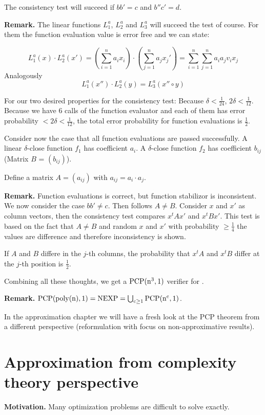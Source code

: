 \documentclass[a4paper]{article}
\newcommand{\cls}[1]{\rm{#1}}
\newcommand{\probl}[1]{\text{\textsc{#1}}}
\begin{document}
The consistency test will succeed if $bb' = c$ and $b''c' = d$.

\textbf{Remark.}
  The linear functions $L_1^a$, $L_2^a$ and $L_3^a$ will
  succeed the test of course. For them the function evaluation
  value is error free and we can state:

\[
  L_1^a(x) \cdot L_2^a(x') = \left(
    \sum_{i=1}^n a_i x_i
  \right) \cdot \left(
    \sum_{j=1}^n a_j x_j'
  \right) = \sum_{i=1}^n \sum_{j=1}^n a_i a_j v_i x_j
\]
Analogously
\[
  L_1^a(x'') \cdot L_2^a(y) = L_3^a(x'' \circ y)
\]

For our two desired properties for the consistency test:
Because $\delta < \frac1{24}$, $2\delta < \frac1{12}$.
Because we have 6 calls of the function evaluator
and each of them has error probability $< 2\delta < \frac1{12}$,
the total error probability for function evaluations is
$\frac12$.

Consider now the case that all function evaluations are passed
successfully. A linear $\delta$-close function $f_1$ has
coefficient $a_i$. A $\delta$-close function $f_2$ has coefficient
$b_{ij}$ (Matrix $B$ = $(b_{ij})$).

Define a matrix $A = (a_{ij})$ with $a_{ij} = a_i \cdot a_j$.

\textbf{Remark.}
  Function evaluations is correct, but function stabilizor is
  inconsistent. We now consider the case $bb' \neq c$. Then
  follows $A \neq B$.
  Consider $x$ and $x'$ as column vectors, then the consistency
  test compares $x^t Ax'$ and $x^t Bx'$. This test is based on
  the fact that $A \neq B$ and random $x$ and $x'$ with probability
  $\geq \frac14$ the values are difference and therefore inconsistency
  is shown.

If $A$ and $B$ differe in the $j$-th columns, the probability that
$x^t A$ and $x^t B$ differ at the $j$-th position is $\frac12$.

Combining all these thoughts, we get a $\cls{PCP}(n^3, 1)$ verifier
for \probl{3~SAT}.

\textbf{Remark.}
  $\cls{PCP}(\operatorname{poly}(n), 1) = \cls{NEXP}
  = \bigcup_{c\geq1} \cls{PCP}(n^c, 1)$.

In the approximation chapter we will have a fresh look at the PCP theorem
from a different perspective (reformulation with focus on non-approximative
results).

\section{Approximation from complexity theory perspective}
%
\textbf{Motivation.}
  Many optimization problems are difficult to solve exactly.
\end{document}
